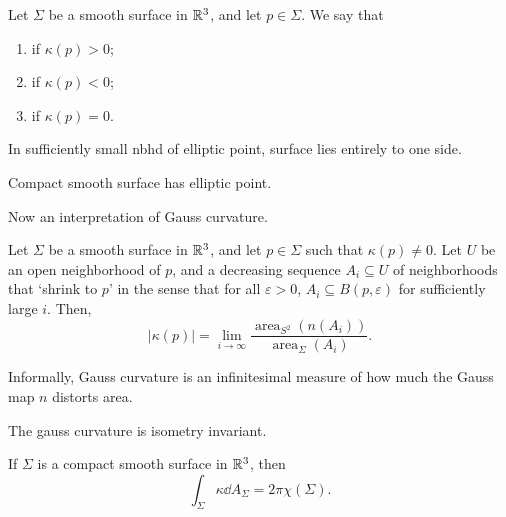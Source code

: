 \documentclass[a4paper, 10pt, twocolumn]{amsart}
\begin{document}
\begin{definition}
    Let $\Sigma$ be a smooth surface in $\mathbb{R}^3$, and let $p \in \Sigma$. We say that
    \begin{enumerate}[label=(\roman*)]
        \item {} if $\kappa(p) > 0$;
        \item {} if $\kappa(p) < 0$;
        \item {} if $\kappa(p) = 0$.
    \end{enumerate}
\end{definition}

\begin{lemma}
    In sufficiently small nbhd of elliptic point, surface lies entirely to one side.
\end{lemma}
\begin{theorem}
    Compact smooth surface has elliptic point.
\end{theorem}

Now an interpretation of Gauss curvature. 

\begin{theorem}
    Let $\Sigma$ be a smooth surface in $\mathbb{R}^3$, and let $p \in \Sigma$ such that $\kappa(p) \neq 0$. Let $U$ be an open neighborhood of $p$, and a decreasing sequence $A_i \subseteq U$ of neighborhoods that `shrink to $p$' in the sense that for all $\varepsilon > 0$, $A_i \subseteq B(p, \varepsilon)$ for sufficiently large $i$. Then,
    $$
    |\kappa(p) | = \lim_{i \to \infty} \frac{\operatorname{area}_{S^2}(n(A_i))}{\operatorname{area}_\Sigma (A_i)}.
    $$
\end{theorem}
Informally, Gauss curvature is an infinitesimal measure of how much the Gauss map $n$ distorts area.

\begin{theorem}
    The gauss curvature is isometry invariant.
\end{theorem}

\begin{theorem}
    If $\Sigma$ is a compact smooth surface in $\mathbb{R}^3$, then
    $$
    \int_{\Sigma} \kappa \dd A_\Sigma = 2 \pi \chi(\Sigma).
    $$
\end{theorem}
\end{document}
